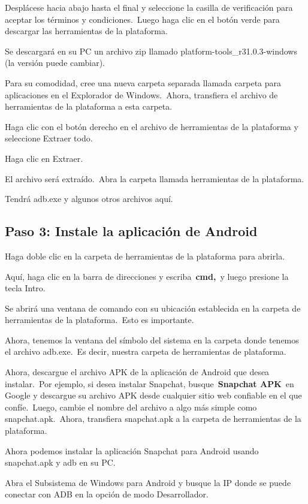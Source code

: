 \documentclass[
  a4paper,
]{article}
\begin{document}
Desplácese hacia abajo hasta el final y seleccione la casilla de
verificación para aceptar los términos y condiciones.~Luego haga clic en
el botón verde para descargar las herramientas de la plataforma.

Se descargará en su PC un archivo zip llamado
platform-tools\_r31.0.3-windows (la versión puede cambiar).

Para su comodidad, cree una nueva carpeta separada llamada carpeta para
aplicaciones en el Explorador de Windows.~Ahora, transfiera el archivo
de herramientas de la plataforma a esta carpeta.

Haga clic con el botón derecho en el archivo de herramientas de la
plataforma y seleccione Extraer todo.

Haga clic en Extraer.

El archivo será extraído.~Abra la carpeta llamada herramientas de la
plataforma.

Tendrá adb.exe y algunos otros archivos aquí.

\subsection{Paso 3: Instale la aplicación de
Android}\label{paso-3-instale-la-aplicaciuxf3n-de-android}

Haga doble clic en la carpeta de herramientas de la plataforma para
abrirla.

Aquí, haga clic en la barra de direcciones y escriba~\textbf{cmd,}~y
luego presione la tecla Intro.

Se abrirá una ventana de comando con su ubicación establecida en la
carpeta de herramientas de la plataforma.~Esto es importante.

Ahora, tenemos la ventana del símbolo del sistema en la carpeta donde
tenemos el archivo adb.exe.~Es decir, nuestra carpeta de herramientas de
plataforma.

Ahora, descargue el archivo APK de la aplicación de Android que desea
instalar.~Por ejemplo, si desea instalar Snapchat,
busque~\textbf{Snapchat APK}~en Google y descargue su archivo APK desde
cualquier sitio web confiable en el que confíe.~Luego, cambie el nombre
del archivo a algo más simple como snapchat.apk.~Ahora, transfiera
snapchat.apk a la carpeta de herramientas de la plataforma.

Ahora podemos instalar la aplicación Snapchat para Android usando
snapchat.apk y adb en su PC.

Abra el Subsistema de Windows para Android y busque la IP donde se puede
conectar con ADB en la opción de modo Desarrollador.
\end{document}
